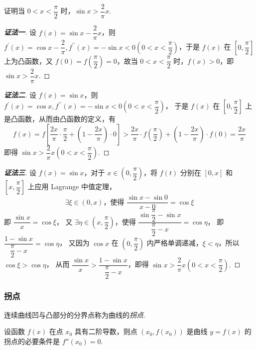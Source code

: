 \begin{example}
    证明当 $0<x<\dfrac{\pi}{2}$ 时，$\sin x>\dfrac{2}{\pi}x.$
\end{example}
\begin{proof}[{\songti \textbf{证法一}}]
    设 $ f(x)=\sin x-\dfrac{2}{\pi} x$，则 $ f^{\prime}(x)=\cos x-\dfrac{2}{\pi}, f^{\prime \prime}(x)=-\sin x<0\left(0<x<\dfrac{\pi}{2}\right)$，于是
    $f(x) $ 在 $ \left[0, \dfrac{\pi}{2}\right] $ 上为凸函数，又 $ f(0)=f\left(\dfrac{\pi}{2}\right)=0$，故当 $ 0<x<\dfrac{\pi}{2} $ 时，$f(x)>0$，即 $ \sin x>\dfrac{2}{\pi} x. $
\end{proof}
\begin{proof}[{\songti \textbf{证法二}}]
    设 $ f(x)=\sin x$，则 $ f^{\prime}(x)=\cos x, f^{\prime \prime}(x)=-\sin x<0\left(0<x<\dfrac{\pi}{2}\right)$，
    于是 $ f(x) $ 在 $ \left[0, \dfrac{\pi}{2}\right] $ 上是凸函数，从而由凸函数的定义，有
    $$f(x)=f\left[\dfrac{2 x}{\pi} \cdot \dfrac{\pi}{2}+\left(1-\dfrac{2 x}{\pi}\right) \cdot 0\right]>\dfrac{2 x}{\pi} \cdot f\left(\dfrac{\pi}{2}\right)+\left(1-\dfrac{2 x}{\pi}\right) \cdot f(0)=\dfrac{2 x}{\pi}$$
    即得 $ \sin x>\dfrac{2}{\pi} x\left(0<x<\dfrac{\pi}{2}\right) .$
\end{proof}
\begin{proof}[{\songti \textbf{证法三}}]
    设 $ f(x)=\sin x$，对于 $ x \in\left(0, \dfrac{\pi}{2}\right)$，将 $ f(t) $ 分别在 $ [0, x] $ 和 $ \left[x, \dfrac{\pi}{2}\right] $ 上应用 Lagrange 中值定理，
    $$\exists\xi \in(0, x) \text{，使得 }\dfrac{\sin x-\sin 0}{x-0}=\cos \xi$$
    即 $ \dfrac{\sin x}{x}=\cos \xi$，
    又 $\exists\eta \in\left(x, \dfrac{\pi}{2}\right) \text{，使得 }\dfrac{\sin \dfrac{\pi}{2}-\sin x}{\dfrac{\pi}{2}-x}=\cos \eta$，
    即 $ \dfrac{1-\sin x}{\dfrac{\pi}{2}-x}=\cos \eta$，
    又因为 $ \cos x $ 在 $ \left(0, \dfrac{\pi}{2}\right) $ 内严格单调递减，$\xi<\eta$，所以 $ \cos \xi>\cos \eta$，
    从而 $ \dfrac{\sin x}{x}>\dfrac{1-\sin x}{\dfrac{\pi}{2}-x}$，即得 $ \sin x>\dfrac{2}{\pi} x\left(0<x<\dfrac{\pi}{2}\right) .$
\end{proof}

\subsubsection{拐点}

\begin{definition}[拐点]
    连续曲线凹与凸部分的分界点称为曲线的\textit{拐点}.
\end{definition}

\begin{theorem}[拐点存在的必要条件]
    设函数 $f(x)$ 在点 $x_0$ 具有二阶导数，则点 $(x_0,f(x_0))$ 是曲线 $y=f(x)$ 的拐点的必要条件是 $f''(x_0)=0.$
\end{theorem}

